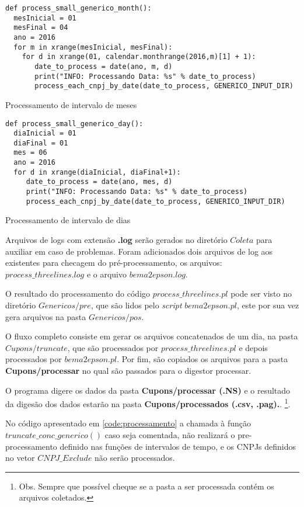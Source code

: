 \documentclass{article}      %
\begin{document}
\begin{listing}[H]
\begin{verbatim}
def process_small_generico_month():
  mesInicial = 01
  mesFinal = 04
  ano = 2016
  for m in xrange(mesInicial, mesFinal):
    for d in xrange(01, calendar.monthrange(2016,m)[1] + 1):
       date_to_process = date(ano, m, d)
       print("INFO: Processando Data: %s" % date_to_process)
       process_each_cnpj_by_date(date_to_process, GENERICO_INPUT_DIR)
\end{verbatim}
\caption{Processamento de intervalo de meses}
\label{code:meses}
\end{listing}


\begin{listing}[H]
\begin{verbatim}
def process_small_generico_day():
  diaInicial = 01
  diaFinal = 01
  mes = 06
  ano = 2016
  for d in xrange(diaInicial, diaFinal+1):
     date_to_process = date(ano, mes, d)
     print("INFO: Processando Data: %s" % date_to_process)
     process_each_cnpj_by_date(date_to_process, GENERICO_INPUT_DIR)
\end{verbatim}
\caption{Processamento de intervalo de dias}
\label{code:dias}
\end{listing}


Arquivos de logs com extensão \textbf{.log} serão gerados no diretório $Coleta$ para auxiliar em caso de problemas. Foram adicionados dois arquivos de log aos existentes para checagem do pré-processamento, os arquivos: $process\_threelines.log$ e o arquivo $bema2epson.log$. 

O resultado do processamento do código $process\_threelines.pl$ pode ser visto no diretório $Genericos/pre$, que são lidos pelo \emph{script} $bema2epson.pl$, este por sua vez gera arquivos na pasta $Genericos/pos$.

O fluxo completo consiste em gerar os arquivos concatenados de um dia, na pasta $Cupons/truncate$, que são processados por $process\_threelines.pl$ e depois processados por $bema2epson.pl$. Por fim, são copiados os arquivos para a pasta \textbf{Cupons/processar} no qual são passados para o digestor processar.

O programa digere os dados da pasta \textbf{Cupons/processar (.NS)} e o resultado da digesão dos dados estarão na pasta \textbf{Cupons/processados (.csv, .pag).}.  \footnote{Obs. Sempre que possível cheque se a pasta a ser processada contém os arquivos coletados.}.

No código apresentado em \ref{code:processamento} a chamada à função $truncate\_conc\_generico()$ caso seja comentada, não realizará o pre-processamento definido nas funções de intervalos de tempo, e os CNPJs definidos no vetor $CNPJ\_Exclude$ não serão processados. 
 
\end{document}
